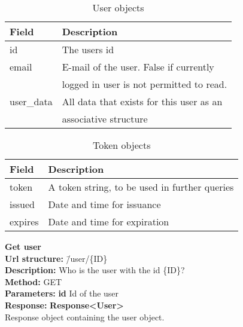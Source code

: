 \documentclass[11pt]{article}
\begin{document}
\begin{table}[H]
\caption{User objects}
\begin{center}
\begin{tabular}{|l|l|}
\hline
 Field                   &  Description                               \\
\hline
 id                      &  The users id                              \\
 \hline
 email                   &  E-mail of the user. False if currently    \\
                         &  logged in user is not permitted to read.  \\
\hline                         
 user\_data  &  All data that exists for this user as an  \\
                         &  associative structure                     \\
\hline
\end{tabular}
\end{center}
\end{table}

\begin{table}[H]
\caption{Token objects}
\begin{center}
\begin{tabular}{|l|l|}
\hline
 Field    &  Description                                    \\
\hline
 token    &  A token string, to be used in further queries  \\
 issued   &  Date and time for issuance                     \\
 expires  &  Date and time for expiration                   \\
\hline
\end{tabular}
\end{center}
\end{table}
 
\begin{tabbing}
\textbf{Get user} \\
\textcolor{black!60}{\textbf{Url structure:}} \hspace{0.2in} \= /user/\{ID\} \\
\textcolor{black!60}{\textbf{Description:}}  \> Who is the user with the id \{ID\}? \\
\textcolor{black!60}{\textbf{Method:}} \> GET \\
\textcolor{black!60}{\textbf{Parameters:}}  \> \textbf{id} Id of the user \\
\textcolor{black!60}{\textbf{Response:}} \> \textbf{Response<User>} \\
\> Response object containing the user object. \\
\end{tabbing}
\end{document}
